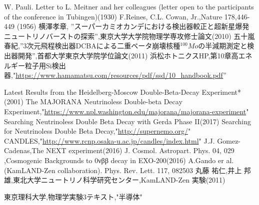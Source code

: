 \documentclass[a4paper,10pt]{jreport}
\begin{document}
\begin{thebibliography}{9}
 W. Pauli. Letter to L. Meitner and her colleagues (letter open to the participants of the conference in Tubingen)(1930)
 F.Reines, C.L. Cowan, Jr.,Nature 178,446-449 (1956)
 横澤孝章, ''スーパーカミオカンデにおける検出器較正と超新星爆発ニュートリノバーストの探索'',東京大学大学院物理学専攻修士論文(2010)
五十嵐春紀,''3次元飛程検出器DCBAによる二重ベータ崩壊核種$^{100}Mo$の半減期測定と検出器開発'',首都大学東京大学院学位論文(2011)
浜松ホトニクスHP,第10章高エネルギー粒子用Si検出器,"\url{https://www.hamamatsu.com/resources/pdf/ssd/10_handbook.pdf}''

Latest Results from the Heidelberg-Moscow Double-Beta-Decay Experiment*(2001)
The MAJORANA Neutrinoless Double-beta Decay Experiment,"\url{https://www.npl.washington.edu/majorana/majorana-experiment}"
Searching Neutrinoless Double Beta Decay with Gerda Phase II(2017)
Searching for Neutrinoless Double Beta Decay,"\url{http://supernemo.org/}"
CANDLES,"\url{http://www.rcnp.osaka-u.ac.jp/candles/index.html}"
J.J. Gomez-Cadenas,The NEXT experiment(2016)
J. Cosmol. Astropart. Phys. 04, 029 ,Cosmogenic Backgrounds to 0νββ decay in EXO-200(2016)
A.Gando er al.(KamLAND-Zen collaboration). Phys. Rev. Lett. 117, 082503 
丸藤 祐仁,井上 邦雄,東北大学ニュートリノ科学研究センター,KamLAND-Zen 実験(2011)

東京理科大学,物理学実験3テキスト,"半導体"
\end{thebibliography}
\end{document}
